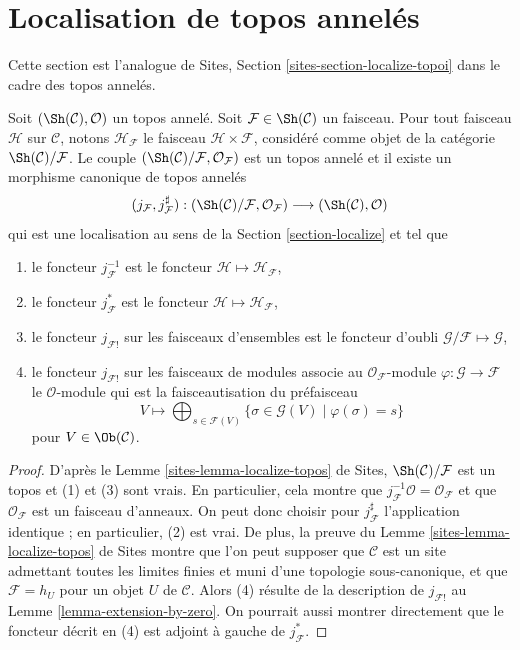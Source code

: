 \section{Localisation de topos annelés}
\label{section-localize-ringed-topoi}

\noindent
Cette section est l'analogue de
Sites, Section \ref{sites-section-localize-topoi}
dans le cadre des topos annelés.

\begin{lemma}
\label{lemma-localize-ringed-topos}
Soit $(\Sh(\mathcal{C}), \mathcal{O})$ un topos annelé.
Soit $\mathcal{F} \in \Sh(\mathcal{C})$ un faisceau.
Pour tout faisceau $\mathcal{H}$ sur $\mathcal{C}$, notons
$\mathcal{H}_\mathcal{F}$ le faisceau $\mathcal{H} \times \mathcal{F}$,
considéré comme objet de la catégorie
$\Sh(\mathcal{C})/\mathcal{F}$. Le couple
$(\Sh(\mathcal{C})/\mathcal{F}, \mathcal{O}_\mathcal{F})$
est un topos annelé et il existe un morphisme canonique de topos annelés
$$
(j_\mathcal{F}, j_\mathcal{F}^\sharp) :
(\Sh(\mathcal{C})/\mathcal{F}, \mathcal{O}_\mathcal{F})
\longrightarrow
(\Sh(\mathcal{C}), \mathcal{O})
$$
qui est une localisation au sens de la
Section \ref{section-localize} et tel que
\begin{enumerate}
\item le foncteur $j_\mathcal{F}^{-1}$ est le foncteur
$\mathcal{H} \mapsto \mathcal{H}_\mathcal{F}$,
\item le foncteur $j_\mathcal{F}^*$ est le foncteur
$\mathcal{H} \mapsto \mathcal{H}_\mathcal{F}$,
\item le foncteur $j_{\mathcal{F}!}$ sur les faisceaux d'ensembles est le
foncteur d'oubli $\mathcal{G}/\mathcal{F} \mapsto \mathcal{G}$,
\item le foncteur $j_{\mathcal{F}!}$ sur les faisceaux de modules associe au
$\mathcal{O}_\mathcal{F}$-module
$\varphi : \mathcal{G} \to \mathcal{F}$ le $\mathcal{O}$-module qui est la
faisceautisation du préfaisceau
$$
V \longmapsto
\bigoplus\nolimits_{s \in \mathcal{F}(V)}
\{\sigma \in \mathcal{G}(V) \mid \varphi(\sigma) = s \}
$$
pour $V \in \Ob(\mathcal{C})$.
\end{enumerate}
\end{lemma}

\begin{proof}
D'après le Lemme \ref{sites-lemma-localize-topos} de Sites,
$\Sh(\mathcal{C})/\mathcal{F}$ est un topos et (1) et (3) sont vrais.
En particulier, cela montre que
$j_\mathcal{F}^{-1}\mathcal{O} = \mathcal{O}_\mathcal{F}$ et que
$\mathcal{O}_\mathcal{F}$ est un faisceau d'anneaux.
On peut donc choisir pour $j_\mathcal{F}^\sharp$ l'application identique ;
en particulier, (2) est vrai. De plus, la preuve du
Lemme \ref{sites-lemma-localize-topos} de Sites montre que l'on peut supposer
que $\mathcal{C}$ est un site admettant toutes les limites finies et muni
d'une topologie sous-canonique, et que $\mathcal{F} = h_U$ pour un objet
$U$ de $\mathcal{C}$. Alors (4) résulte de la description de
$j_{\mathcal{F}!}$ au Lemme \ref{lemma-extension-by-zero}.
On pourrait aussi montrer directement que le foncteur décrit en (4) est
adjoint à gauche de $j_\mathcal{F}^*$.
\end{proof}

